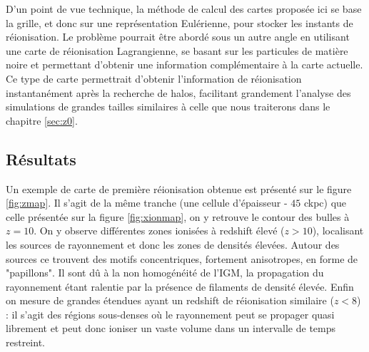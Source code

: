 D'un point de vue technique, la méthode de calcul des cartes proposée ici se base la grille, et donc sur une représentation Eulérienne, pour stocker les instants de réionisation.
Le problème pourrait être abordé sous un autre angle en utilisant une carte de réionisation Lagrangienne, se basant sur les particules de matière noire et permettant d'obtenir une information complémentaire à la carte actuelle.
Ce type de carte permettrait d'obtenir l'information de réionisation instantanément après la recherche de halos, facilitant grandement l'analyse des simulations de grandes tailles similaires à celle que nous traiterons dans le chapitre \ref{sec:z0}.


\subsection{Résultats}
Un exemple de carte de première réionisation obtenue est présenté sur le figure \ref{fig:zmap}.
Il s'agit de la même tranche (une cellule d’épaisseur - $45$ ckpc) que celle présentée sur la figure \ref{fig:xionmap}, on y retrouve le contour des bulles à $z=10$.
On y observe différentes zones ionisées à redshift élevé ($z>10$), localisant les sources de rayonnement et donc les zones de densités élevées.
Autour des sources ce trouvent des motifs concentriques, fortement anisotropes, en forme de "papillons".
Il sont dû à la non homogénéité de l'\ac{IGM}, la propagation du rayonnement étant ralentie par la présence de filaments de densité élevée.
Enfin on mesure de grandes étendues ayant un redshift de réionisation similaire ($z<8$) : il s'agit des régions sous-denses où le rayonnement peut se propager quasi librement et peut donc ioniser un vaste volume dans un intervalle de temps restreint.

